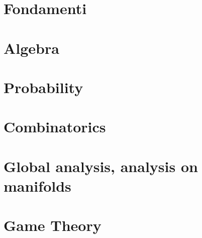 \documentclass[a4paper,10pt]{book}
\begin{document}
  \tableofcontents

  
  \part{Fondamenti}
  
  \part{Algebra}
  

  \part{Probability}
  
  
  \part{Combinatorics}
  
  
  \part{Global analysis, analysis on manifolds}  
  
  
  \part{Game Theory}
  
  
 
  \cleardoublepage

  
\end{document}
